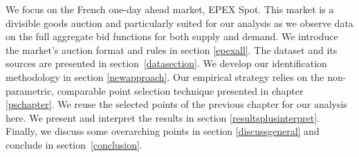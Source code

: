 
We focus on the French one-day ahead market, EPEX Spot. This market is a divisible goods auction and 
particularly suited for our analysis as we observe data on the full aggregate bid functions for both supply and demand.  We introduce the market's auction format and rules in section \ref{epexall}.
The dataset and its sources are presented in section~\ref{datasection}.
We develop our identification methodology in section \ref{newapproach}. Our empirical strategy relies on the non-parametric, comparable point selection technique presented in chapter \ref{pschapter}. 
We reuse the selected points of the previous chapter for our analysis here. 
We present and interpret the results in section \ref{resultsplusinterpret}. 
Finally, we discuss some overarching points in section \ref{discussgeneral} and conclude in section~\ref{conclusion}.




